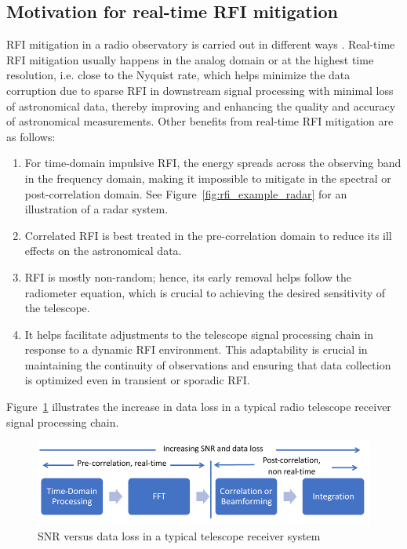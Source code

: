\subsection{Motivation for real-time RFI mitigation}
\label{subsection:hardware:introduction: motivations}

RFI mitigation in a radio observatory is carried out in different ways \citep{ford2014rfi}. Real-time RFI mitigation usually happens in the analog domain or at the highest time resolution, i.e. close to the Nyquist rate, which helps minimize the data corruption due to sparse RFI in downstream signal processing with minimal loss of astronomical data, thereby improving and enhancing the quality and accuracy of astronomical measurements. Other benefits from real-time RFI mitigation are as follows:

\begin{enumerate}
\item For time-domain impulsive RFI, the energy spreads across the observing band in the frequency domain, making it impossible to mitigate in the spectral or post-correlation domain.  See Figure~\ref{fig:rfi_example_radar} for an illustration of a radar system.

\item Correlated RFI is best treated in the pre-correlation domain to reduce its ill effects on the astronomical data.

\item RFI is mostly non-random; hence, its early removal helps follow the radiometer equation, which is crucial to achieving the desired sensitivity of the telescope.

\item It helps facilitate adjustments to the telescope signal processing chain in response to a dynamic RFI environment. This adaptability is crucial in maintaining the continuity of observations and ensuring that data collection is optimized even in transient or sporadic RFI.
\end{enumerate}

Figure~\ref{fig:real-time-rfi} illustrates the increase in data loss in a typical radio telescope receiver signal processing chain.

\begin{figure}
    \centering
    \includegraphics[scale=0.8]{Hardware Excision Techniques/figures/rt.jpg}
    \caption{SNR versus data loss in a typical telescope receiver system}
    \label{fig:real-time-rfi}
\end{figure}


